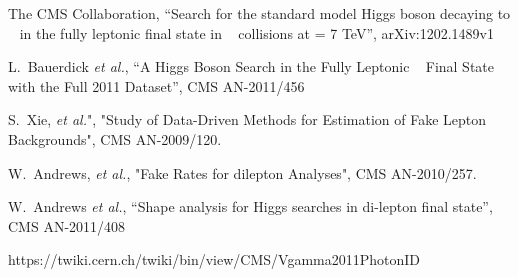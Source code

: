 \begin{thebibliography}{99}

  The CMS Collaboration, ``Search for the standard model Higgs boson decaying to \wwpm~ in the fully leptonic ﬁnal state in \PP~ collisions at \sqrts= 7 TeV'',
  arXiv:1202.1489v1 
     
  L.~Bauerdick {\it et al.}, ``A Higgs Boson Search in the Fully Leptonic \wwpm~ Final State with the Full 2011 Dataset'',
  CMS AN-2011/456 

S.~Xie, \textit{et al.}", "Study of Data-Driven Methods for Estimation of Fake Lepton Backgrounds", 
CMS AN-2009/120.

W.~Andrews, \textit{et al.}, "Fake Rates for dilepton Analyses", CMS AN-2010/257.

  W.~Andrews {\it et al.}, ``Shape analysis for Higgs searches in di-lepton final state'',
  CMS AN-2011/408

  https://twiki.cern.ch/twiki/bin/view/CMS/Vgamma2011PhotonID

\end{thebibliography}


